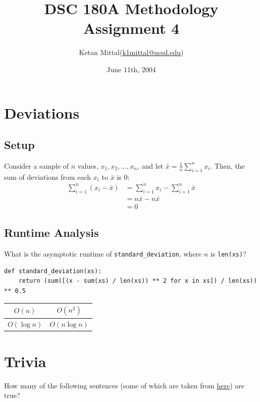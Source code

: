 \documentclass{article}
\title{DSC 180A Methodology Assignment 4}
\author{Ketan Mittal(\href{mailto:k1mittal@ucsd.edu}{k1mittal@ucsd.edu})}
\date{June 11th, 2004}
\begin{document}
\maketitle

\section{Deviations}

\subsection{Setup}

Consider a sample of $n$ values, $x_1, x_2, \ldots, x_n$, and let $\bar{x} = \frac{1}{n} \sum_{i = 1}^n x_i$. Then, the sum of deviations from each $x_i$ to $\bar{x}$ is 0:
\begin{align*}
    \sum_{i = 1}^n (x_i - \bar{x}) &= \sum_{i = 1}^n x_i - \sum_{i = 1}^n \bar{x} \\
    &= n\bar{x} - n\bar{x} \\
    &= \boxed{0}
\end{align*}

\subsection{Runtime Analysis}

What is the asymptotic runtime of \texttt{standard\_deviation}, where $n$ is \texttt{len(xs)}?

\begin{verbatim}
def standard_deviation(xs):
    return (sum([(x - sum(xs) / len(xs)) ** 2 for x in xs]) / len(xs)) ** 0.5
\end{verbatim}

\begin{center}
\begin{tabular}{|c|c|}
    \hline
    $O(n)$ & $O(n^2)$ \\
    \hline
    $O(\log n)$ & $O(n \log n)$ \\
    \hline
\end{tabular}
\end{center}

\section{Trivia}

How many of the following sentences (some of which are taken from \href{https://www.signupgenius.com/groups/true-or-false-questions.cfm}{here}) are true?
\end{document}
